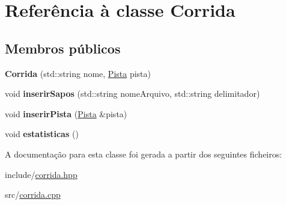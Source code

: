 \hypertarget{classCorrida}{}\section{Referência à classe Corrida}
\label{classCorrida}
\subsection*{Membros públicos}
\begin{DoxyCompactItemize}
\item 
\mbox{\label{classCorrida_af7f2ee1293264e939c4a308d4b7f758b}} 
{\bfseries Corrida} (std\+::string nome, \hyperlink{classPista}{Pista} pista)
\item 
\mbox{\label{classCorrida_aee79fcba9ecca389b2e31f517490fc73}} 
void {\bfseries inserir\+Sapos} (std\+::string nome\+Arquivo, std\+::string delimitador)
\item 
\mbox{\label{classCorrida_a33a43c94ba401279c8ed3774eb735799}} 
void {\bfseries inserir\+Pista} (\hyperlink{classPista}{Pista} \&pista)
\item 
\mbox{\label{classCorrida_a2207244d6ca1dc4e4dd6afe2ef2c9884}} 
void {\bfseries estatisticas} ()
\end{DoxyCompactItemize}


A documentação para esta classe foi gerada a partir dos seguintes ficheiros\+:\begin{DoxyCompactItemize}
\item 
include/\hyperlink{corrida_8hpp}{corrida.\+hpp}\item 
src/\hyperlink{corrida_8cpp}{corrida.\+cpp}\end{DoxyCompactItemize}
